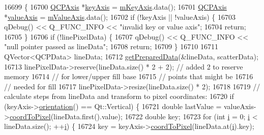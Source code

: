 \begin{DoxyCode}
16699                                                                         \{
16700   \hyperlink{class_q_c_p_axis}{QCPAxis} *\hyperlink{class_q_c_p_abstract_plottable_a72c7a09c22963f2c943f07112b311103}{keyAxis} = \hyperlink{class_q_c_p_abstract_plottable_a426f42e254d0f8ce5436a868c61a6827}{mKeyAxis}.data();
16701   \hyperlink{class_q_c_p_axis}{QCPAxis} *\hyperlink{class_q_c_p_abstract_plottable_a3106f9d34d330a6097a8ec5905e5b519}{valueAxis} = \hyperlink{class_q_c_p_abstract_plottable_a2901452ca4aea911a1827717934a4bda}{mValueAxis}.data();
16702   \textcolor{keywordflow}{if} (!keyAxis || !valueAxis) \{
16703     qDebug() << Q\_FUNC\_INFO << \textcolor{stringliteral}{"invalid key or value axis"};
16704     \textcolor{keywordflow}{return};
16705   \}
16706   \textcolor{keywordflow}{if} (!linePixelData) \{
16707     qDebug() << Q\_FUNC\_INFO << \textcolor{stringliteral}{"null pointer passed as lineData"};
16708     \textcolor{keywordflow}{return};
16709   \}
16710 
16711   QVector<QCPData> lineData;
16712   \hyperlink{class_q_c_p_graph_ab420b46ba638dc3252439fe16687b244}{getPreparedData}(&lineData, scatterData);
16713   linePixelData->reserve(lineData.size() * 2 + 2); \textcolor{comment}{// added 2 to reserve memory}
16714                                                    \textcolor{comment}{// for lower/upper fill base}
16715                                                    \textcolor{comment}{// points that might be}
16716                                                    \textcolor{comment}{// needed for fill}
16717   linePixelData->resize(lineData.size() * 2);
16718 
16719   \textcolor{comment}{// calculate steps from lineData and transform to pixel coordinates:}
16720   \textcolor{keywordflow}{if} (keyAxis->\hyperlink{class_q_c_p_axis_a57483f2f60145ddc9e63f3af53959265}{orientation}() == Qt::Vertical) \{
16721     \textcolor{keywordtype}{double} lastValue = valueAxis->\hyperlink{class_q_c_p_axis_a985ae693b842fb0422b4390fe36d299a}{coordToPixel}(lineData.first().value);
16722     \textcolor{keywordtype}{double} key;
16723     \textcolor{keywordflow}{for} (\textcolor{keywordtype}{int} \hyperlink{_comparision_pictures_2_createtest_image_8m_a6f6ccfcf58b31cb6412107d9d5281426}{i} = 0; \hyperlink{_comparision_pictures_2_createtest_image_8m_a6f6ccfcf58b31cb6412107d9d5281426}{i} < lineData.size(); ++\hyperlink{_comparision_pictures_2_createtest_image_8m_a6f6ccfcf58b31cb6412107d9d5281426}{i}) \{
16724       key = keyAxis->\hyperlink{class_q_c_p_axis_a985ae693b842fb0422b4390fe36d299a}{coordToPixel}(lineData.at(\hyperlink{_comparision_pictures_2_createtest_image_8m_a6f6ccfcf58b31cb6412107d9d5281426}{i}).key);

\end{DoxyCode}
